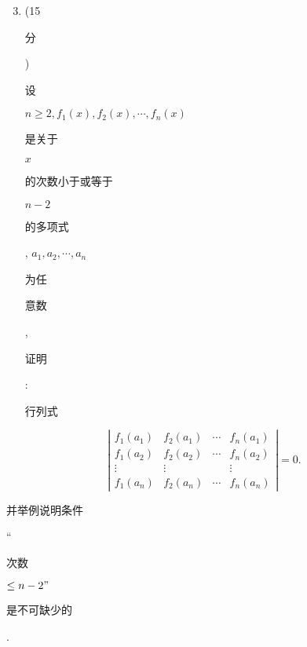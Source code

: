 \documentclass[10pt]{article}
\begin{document}
\begin{enumerate}
  \setcounter{enumi}{2}
  \item (15 \begin{CJK}{UTF8}{mj}分\end{CJK}) \begin{CJK}{UTF8}{mj}设\end{CJK} $n \geq 2, f_{1}(x), f_{2}(x), \cdots, f_{n}(x)$ \begin{CJK}{UTF8}{mj}是关于\end{CJK} $x$ \begin{CJK}{UTF8}{mj}的次数小于或等于\end{CJK} $n-2$ \begin{CJK}{UTF8}{mj}的多项式\end{CJK}, $a_{1}, a_{2}, \cdots, a_{n}$ \begin{CJK}{UTF8}{mj}为任\end{CJK} \begin{CJK}{UTF8}{mj}意数\end{CJK}, \begin{CJK}{UTF8}{mj}证明\end{CJK}: \begin{CJK}{UTF8}{mj}行列式\end{CJK}
\end{enumerate}
$$
\left|\begin{array}{cccc}
f_{1}\left(a_{1}\right) & f_{2}\left(a_{1}\right) & \cdots & f_{n}\left(a_{1}\right) \\
f_{1}\left(a_{2}\right) & f_{2}\left(a_{2}\right) & \cdots & f_{n}\left(a_{2}\right) \\
\vdots & \vdots & & \vdots \\
f_{1}\left(a_{n}\right) & f_{2}\left(a_{n}\right) & \cdots & f_{n}\left(a_{n}\right)
\end{array}\right|=0 .
$$
\begin{CJK}{UTF8}{mj}并举例说明条件\end{CJK}“\begin{CJK}{UTF8}{mj}次数\end{CJK} $\leq n-2 "$ \begin{CJK}{UTF8}{mj}是不可缺少的\end{CJK}.
\end{document}
